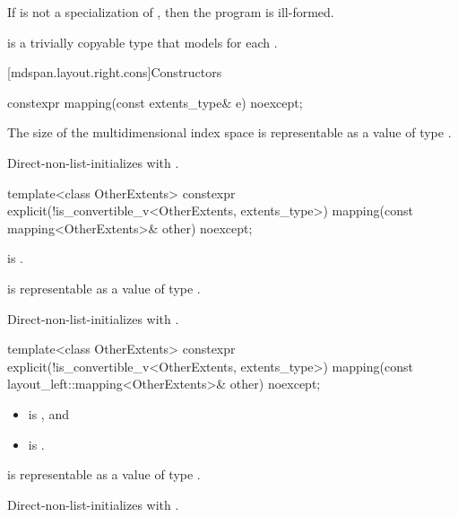 \pnum
If  is not a specialization of ,
then the program is ill-formed.

\pnum
{} is a trivially copyable type
that models  for each .

[mdspan.layout.right.cons]{Constructors}

%
\begin{itemdecl}
constexpr mapping(const extents_type& e) noexcept;
\end{itemdecl}

\begin{itemdescr}
\pnum
\expects
The size of the multidimensional index space  is representable as
a value of type .

\pnum
\effects
Direct-non-list-initializes  with .
\end{itemdescr}

%
\begin{itemdecl}
template<class OtherExtents>
  constexpr explicit(!is_convertible_v<OtherExtents, extents_type>)
    mapping(const mapping<OtherExtents>& other) noexcept;
\end{itemdecl}

\begin{itemdescr}
\pnum
\constraints
{} is .

\pnum
\expects
{} is representable as
a value of type .

\pnum
\effects
Direct-non-list-initializes  with .
\end{itemdescr}

%
\begin{itemdecl}
template<class OtherExtents>
  constexpr explicit(!is_convertible_v<OtherExtents, extents_type>)
    mapping(const layout_left::mapping<OtherExtents>& other) noexcept;
\end{itemdecl}

\begin{itemdescr}
\pnum
\constraints
\begin{itemize}
\item
{} is , and
\item
{} is .
\end{itemize}

\pnum
\expects
{} is representable as
a value of type .

\pnum
\effects
Direct-non-list-initializes  with .
\end{itemdescr}

